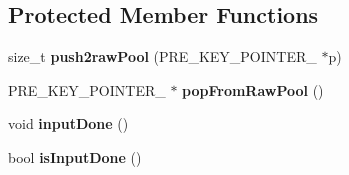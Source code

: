 \subsection*{Protected Member Functions}
\begin{CompactItemize}
\item 
\hypertarget{classAlphaSort_b6b536a52a5309b90b264342a538004b}{
size\_\-t \textbf{push2rawPool} (PRE\_\-KEY\_\-POINTER\_\- $\ast$p)}
\label{classAlphaSort_b6b536a52a5309b90b264342a538004b}

\item 
\hypertarget{classAlphaSort_9a20305c9832f8bc9e6aa07ed2118abf}{
PRE\_\-KEY\_\-POINTER\_\- $\ast$ \textbf{popFromRawPool} ()}
\label{classAlphaSort_9a20305c9832f8bc9e6aa07ed2118abf}

\item 
\hypertarget{classAlphaSort_b6bdcb6f34b98dc26dc307c2f8d58bf8}{
void \textbf{inputDone} ()}
\label{classAlphaSort_b6bdcb6f34b98dc26dc307c2f8d58bf8}

\item 
\hypertarget{classAlphaSort_1caacff3e55a69f0b4a477a14e74039b}{
bool \textbf{isInputDone} ()}
\label{classAlphaSort_1caacff3e55a69f0b4a477a14e74039b}


\end{CompactItemize}
